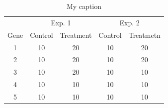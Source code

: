 \documentclass[11pt, a4paper]{article}
\begin{document}
%
	\begin{center}
	    \begin{table}\centering
		\caption{My caption}\label{table:reference}
		\begin{tabular}{ccccc} \\ \hline
		    &  \multicolumn{2}{c}{Exp. 1} & \multicolumn{2}{c}{Exp. 2} \\
		    Gene  & Control & Treatment & Control & Treatmetn \\
		    \hline
		    1     & 10       & 20       & 10    &20   \\
		    2     & 10       & 20       & 10    &20   \\
		    3     & 10       & 20       & 10    &10   \\
		    4     & 10       & 10       & 10    &10   \\ 
		    5     & 10       & 10       & 10    &10   \\  
		\end{tabular}
	    \end{table}
	\end{center}
\end{document}

